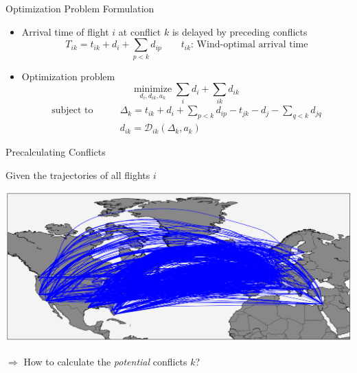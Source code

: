 \documentclass[10pt]{beamer}
\begin{document}
\begin{frame}[t]{Optimization Problem Formulation}
    \begin{itemize}
        \item Arrival time of flight $i$ at conflict $k$ is delayed by preceding conflicts
            \begin{equation*}
                T_{ik} = t_{ik} + d_i +  \sum_{p<k} d_{ip} \qquad t_{ik} \text{: Wind-optimal arrival time}
            \end{equation*}
        \item Optimization problem 
            \begin{equation*}
                \underset{d_i, d_{ik}, a_k}{\text{minimize}} \; \sum_i d_i + \sum_{ik} d_{ik}
            \end{equation*}
            \begin{align*}
                \text{subject to} \qquad
                & \Delta_{k} = t_{ik} + d_i + \sum_{p<k} d_{ip} - t_{jk} - d_j - \sum_{q<k} d_{jq} \\
                & d_{ik} = \mathcal{D}_{ik}(\Delta_{k}, a_k) 
            \end{align*}

    \end{itemize}
\end{frame}
\begin{frame}[t]{Precalculating Conflicts}
    \begin{minipage}[t]{0.4\linewidth}
        Given the trajectories of all flights $i$ 
    \end{minipage}
    \hfill
    \begin{minipage}[c]{0.5\linewidth}
        \includegraphics[width=1.0\textwidth]{images/wind_optimal_trajectories.png}
    \end{minipage}
    \vspace{1cm}
    \begin{center}
        $\Rightarrow$ How to calculate the \emph{potential} conflicts $k$?
    \end{center}
\end{frame}
\end{document}
